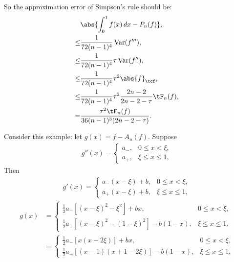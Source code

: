 \documentclass[]{elsarticle}
\DeclareMathOperator{\Var}{Var}
\theoremstyle{definition}
\theoremstyle{remark}
\newcommand{\Ftnorm}[1]{\abs{#1}_{\tcf}}
\begin{document}
So the approximation error of Simpson's rule should be:
\begin{align*}
&\abs{\int_0^1 f(x) \, dx - P_n(f)},\\
 \le &\frac{1}{72(n-1)^4} \Var(f'''),\\
 \le &\frac{1}{72(n-1)^4} \tau\Var(f''),\\
 \le &\frac{1}{72(n-1)^4} \tau^2\Ftnorm{f},\\
 \le &\frac{1}{72(n-1)^4} \tau^2\frac{2n-2}{2n-2-\tau}\tF_n(f),\\
 = & \frac{\tau^2 \tF_n(f)}{36(n-1)^3(2n-2-\tau)}.
\end{align*}

Consider this example: let $g(x)=f-A_n(f)$. Suppose
\begin{align*}
  g''(x)= \begin{cases} \displaystyle a_{-}, & 0 \le x < \xi,\\[1ex]
\displaystyle  a_{+}, & \xi \le x \le 1,
\end{cases}
\end{align*}
Then
\begin{align*}
  g'(x)= \begin{cases} \displaystyle a_{-}(x-\xi)+b, & 0 \le x < \xi,\\[1ex]
\displaystyle  a_{+}(x-\xi)+b, & \xi \le x \le 1,
\end{cases}
\end{align*}
\begin{align*}
  g(x)&= \begin{cases} \displaystyle \frac{1}{2}a_{-}[(x-\xi)^2-\xi^2]+bx, & 0 \le x < \xi,\\[1ex]
\displaystyle  \frac{1}{2}a_{+}[(x-\xi)^2-(1-\xi)^2]-b(1-x), & \xi \le x \le 1,
\end{cases}\\
&=\begin{cases} \displaystyle \frac{1}{2}a_{-}[x(x-2\xi)]+bx, & 0 \le x < \xi,\\[1ex]
\displaystyle  \frac{1}{2}a_{+}[(x-1)(x+1-2\xi)]-b(1-x), & \xi \le x \le 1,
\end{cases}
\end{align*}
\end{document}
